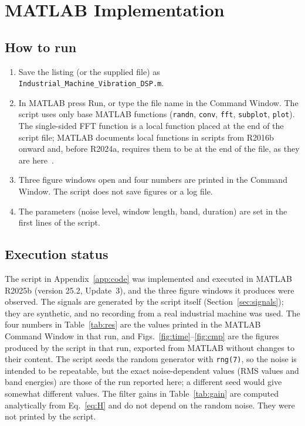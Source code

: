 \documentclass[10pt,twocolumn,a4paper]{article}
\begin{document}
\section{MATLAB Implementation}
\subsection{How to run}
\begin{enumerate}
\item Save the listing (or the supplied file) as \texttt{Industrial\_Machine\_Vibration\_DSP.m}.
\item In MATLAB press Run, or type the file name in the Command Window. The script uses only base MATLAB functions (\texttt{randn}, \texttt{conv},
\texttt{fft}, \texttt{subplot}, \texttt{plot}). The single-sided FFT function is a local function placed at the end of the script file;
MATLAB documents local functions in scripts from R2016b onward and, before R2024a, requires them to be at the end of the file, as they are here~\cite{mathworks}.
\item Three figure windows open and four numbers are printed in the Command Window. The script does not save figures or a log file.
\item The parameters (noise level, window length, band, duration) are set in the first lines of the script.
\end{enumerate}

\subsection{Execution status}\label{sec:verif}
The script in Appendix~\ref{app:code} was implemented and executed in MATLAB R2025b (version 25.2, Update~3), and the three figure windows it produces were observed.
The signals are generated by the script itself (Section~\ref{sec:signals}); they are synthetic, and no recording from a real industrial machine was used.
The four numbers in Table~\ref{tab:res} are the values printed in the MATLAB Command Window in that run, and Figs.~\ref{fig:time}--\ref{fig:cmp} are the figures
produced by the script in that run, exported from MATLAB without changes to their content. The script seeds the random generator with \texttt{rng(7)}, so the noise
is intended to be repeatable, but the exact noise-dependent values (RMS values and band energies) are those of the run reported here; a different seed would give somewhat different values.
The filter gains in Table~\ref{tab:gain} are computed analytically from Eq.~\eqref{eq:H} and do not depend on the random noise. They were not printed by the script.
\end{document}
